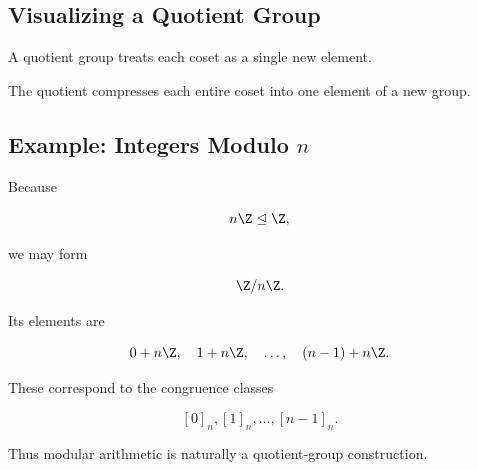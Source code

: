 \subsection{Visualizing a Quotient Group}
\label{subsec:visual-quotient-group}

A quotient group treats each coset as a single new element.

\begin{center}
\end{center}

The quotient compresses each entire coset into one element of a new group.

\subsection{Example: Integers Modulo \(n\)}
\label{subsec:quotient-z-nz}

Because

\[ n\Z\trianglelefteq\Z, \]

we may form

\[ \Z/n\Z. \]

Its elements are

\[ 0+n\Z,\quad1+n\Z,\quad\ldots,\quad(n-1)+n\Z. \]

These correspond to the congruence classes

\[ [0]_n,[1]_n,\ldots,[n-1]_n. \]

Thus modular arithmetic is naturally a quotient-group construction.

